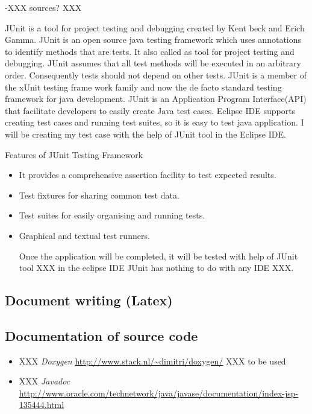 \documentclass{report}
\begin{document}
-XXX sources? XXX

JUnit is a tool for project testing and debugging created by Kent beck and Erich Gamma.
JUnit is an open source java testing framework which uses annotations to identify methods that are tests. It also called as tool for project testing and debugging. JUnit assumes that all test methods will be executed in an arbitrary order. Consequently tests should not depend on other tests.
JUnit is a member of the xUnit testing frame work family and now the de facto standard testing framework for java development. JUnit is an Application Program Interface(API) that facilitate developers to easily create Java test cases.
Eclipse IDE supports creating test cases and running test suites, so it is easy to test java application.
I will be creating my test case with the help of JUnit tool in the Eclipse IDE.

Features of JUnit Testing Framework
\begin{itemize}

\item It provides a comprehensive assertion facility to test expected results.
\item Test fixtures for sharing common test data.
\item Test suites for easily organising and running tests.
\item Graphical and textual test runners.

Once the application will be completed, it will be tested with help of JUnit tool XXX in the eclipse IDE  JUnit has nothing to do with any IDE XXX.


\end{itemize}

\subsection{Document writing (Latex)}
\label{sec:latex}

\subsection{Documentation of source code}
\label{sec:documentsource}

\begin{itemize}
\item XXX \textit{Doxygen} \url{http://www.stack.nl/~dimitri/doxygen/} XXX to be used
\item XXX \textit{Javadoc} \url{http://www.oracle.com/technetwork/java/javase/documentation/index-jsp-135444.html}
\end{itemize}
\end{document}
